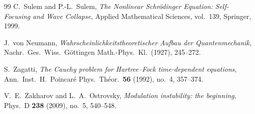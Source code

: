 \documentclass[11pt]{amsart}
\theoremstyle{definition}
\begin{document}
\begin{thebibliography}{99}
C.~Sulem and P.-L.~Sulem, \emph{The Nonlinear Schr\"odinger Equation: Self-Focusing and Wave Collapse}, Applied Mathematical Sciences, vol.~139, Springer, 1999.

J.~von Neumann, \emph{Wahrscheinlichkeitstheoretischer Aufbau der Quantenmechanik}, Nachr.\ Ges.\ Wiss.\ G\"ottingen Math.-Phys.\ Kl.\ (1927), 245--272.


S.~Zagatti, \emph{The Cauchy problem for Hartree--Fock time-dependent equations}, Ann.\ Inst.\ H.\ Poincar\'e Phys.\ Th\'eor.\ \textbf{56} (1992), no.~4, 357--374.

V.~E.~Zakharov and L.~A.~Ostrovsky, \emph{Modulation instability: the beginning}, Phys.\ D \textbf{238} (2009), no.~5, 540--548.
\end{thebibliography}
\end{document}
